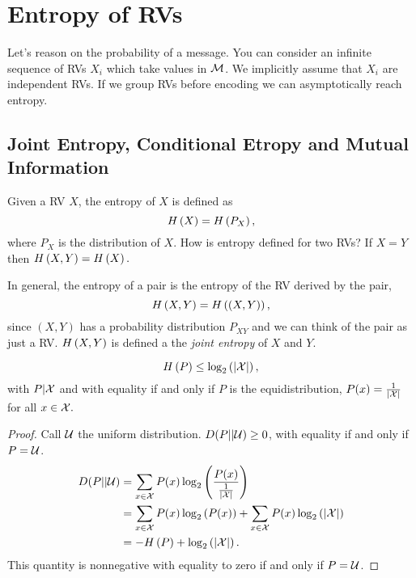 \chapter{Entropy of \aclp{RV}}

Let's reason on the probability of a message.
You can consider an infinite sequence of \acp{RV} $X_i$ which take values in $\mathcal{M}$.
We implicitly assume that $X_i$ are independent \acp{RV}.
If we group \acp{RV} before encoding we can asymptotically reach entropy.

\section{Joint Entropy, Conditional Etropy and Mutual Information}

Given a \ac{RV} $X$, the entropy of $X$ is defined as
\begin{equation*}
	H\left({X}\right) = H\left({P_X}\right),
\end{equation*}
where $P_X$ is the distribution of $X$.
How is entropy defined for two \acp{RV}?
If $X = Y$ then $H\left({X,Y}\right) = H\left({X}\right).$

\begin{definition}
	In general, the entropy of a pair is the entropy of the \ac{RV} derived by the pair, \ie
	\begin{equation*}
		H\left({X,Y}\right) = H\left({(X,Y)}\right), 
	\end{equation*}
	since $(X, Y)$ has a probability distribution $P_{XY}$ and we can think of the pair as just a \ac{RV}.
	$H\left({X,Y}\right)$ is defined a the \emph{joint entropy} of $X$ and $Y$. 
\end{definition}

\begin{prop}
	\begin{equation*}
		H\left({P}\right) \le \log_2 \left( \left|{\mathcal{X}}\right| \right),
	\end{equation*}
	with $P|\mathcal{X}$ and with equality if and only if $P$ is the equidistribution, \ie $P(x) = \frac{1}{\left|{\mathcal{X}}\right|}$ for all $x \in \mathcal{X}.$
\end{prop}

\begin{proof}
	Call $\mathcal{U}$ the uniform distribution.
	$D(P||\mathcal{U})\ge 0$, with equality if and only if $P = \mathcal{U}$.
	\begin{align*}
		D(P||\mathcal{U})
		& =
		\sum_{x \in \mathcal{X}} P(x) \log_2 \left( \frac{P(x)}{\frac{1}{\left|{\mathcal{X}}\right|}} \right)
		\\
		& =
		\sum_{x \in \mathcal{X}} P(x) \log_2 \left( P(x) \right)
		+
		\sum_{x \in \mathcal{X}} P(x) \log_2 \left( \left|{\mathcal{X}}\right| \right)
		\\
		& =
		-H\left({P}\right) + \log_2 \left( \left|{\mathcal{X}}\right| \right).
	\end{align*}
	This quantity is nonnegative with equality to zero if and only if $P = \mathcal{U}$.
\end{proof}

